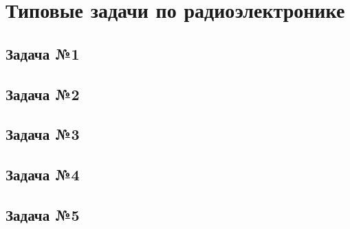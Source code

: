 \documentclass[a4paper,14pt]{extarticle}
\theoremstyle{definition}
\begin{document}
\section{Типовые задачи по радиоэлектронике}

\subsection{Задача №1}

\newpage

\subsection{Задача №2}

\newpage

\subsection{Задача №3}

\newpage

\subsection{Задача №4}


\subsection{Задача №5}

\end{document}
